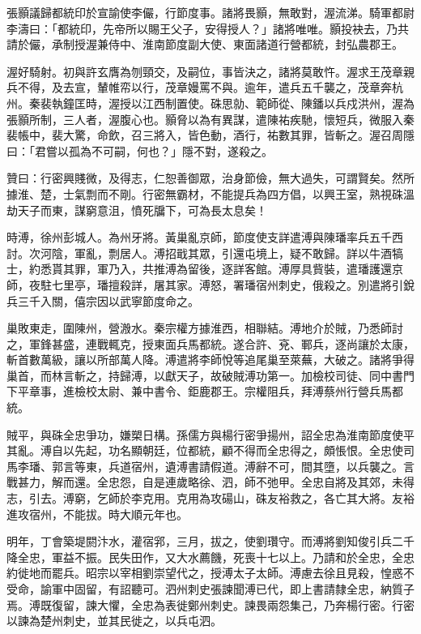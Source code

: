 \begin{pinyinscope}
 張顥議歸都統印於宣諭使李儼，行節度事。諸將畏顥，無敢對，渥流涕。騎軍都尉李濤曰：「都統印，先帝所以賜王父子，安得授人？」諸將唯唯。顥投袂去，乃共請於儼，承制授渥兼侍中、淮南節度副大使、東面諸道行營都統，封弘農郡王。



 渥好騎射。初與許玄膺為刎頸交，及嗣位，事皆決之，諸將莫敢忤。渥求王茂章親兵不得，及去宣，輦帷帟以行，茂章嫚罵不與。逾年，遣兵五千襲之，茂章奔杭州。秦裴執鐘匡時，渥授以江西制置使。硃思勍、範師從、陳鐇以兵戍洪州，渥為張顥所制，三人者，渥腹心也。顥脅以為有異謀，遣陳祐疾馳，懷短兵，微服入秦裴帳中，裴大驚，命飲，召三將入，皆色動，酒行，祐數其罪，皆斬之。渥召周隱曰：「君嘗以孤為不可嗣，何也？」隱不對，遂殺之。



 贊曰：行密興賤微，及得志，仁恕善御眾，治身節儉，無大過失，可謂賢矣。然所據淮、楚，士氣剽而不剛。行密無霸材，不能提兵為四方倡，以興王室，熟視硃溫劫天子而東，謀窮意沮，憤死牖下，可為長太息矣！



 時溥，徐州彭城人。為州牙將。黃巢亂京師，節度使支詳遣溥與陳璠率兵五千西討。次河陰，軍亂，剽居人。溥招戢其眾，引還屯境上，疑不敢歸。詳以牛酒犒士，約悉貰其罪，軍乃入，共推溥為留後，逐詳客館。溥厚具貲裝，遣璠護還京師，夜駐七里亭，璠擅殺詳，屠其家。溥怒，署璠宿州刺史，俄殺之。別遣將引銳兵三千入關，僖宗因以武寧節度命之。



 巢敗東走，圍陳州，營溵水。秦宗權方據淮西，相聯結。溥地介於賊，乃悉師討之，軍鋒甚盛，連戰輒克，授東面兵馬都統。遂合許、兗、鄆兵，逐尚讓於太康，斬首數萬級，讓以所部萬人降。溥遣將李師悅等追尾巢至萊蕪，大破之。諸將爭得巢首，而林言斬之，持歸溥，以獻天子，故破賊溥功第一。加檢校司徒、同中書門下平章事，進檢校太尉、兼中書令、鉅鹿郡王。宗權阻兵，拜溥蔡州行營兵馬都統。



 賊平，與硃全忠爭功，嫌槊日構。孫儒方與楊行密爭揚州，詔全忠為淮南節度使平其亂。溥自以先起，功名顯朝廷，位都統，顧不得而全忠得之，頗悵恨。全忠使司馬李璠、郭言等東，兵道宿州，遺溥書請假道。溥辭不可，間其墮，以兵襲之。言戰甚力，解而還。全忠怨，自是連歲略徐、泗，師不弛甲。全忠自將及其郊，未得志，引去。溥窮，乞師於李克用。克用為攻碭山，硃友裕救之，各亡其大將。友裕進攻宿州，不能拔。時大順元年也。



 明年，丁會築堤閼汴水，灌宿郛，三月，拔之，使劉瓚守。而溥將劉知俊引兵二千降全忠，軍益不振。民失田作，又大水薦饑，死喪十七以上。乃請和於全忠，全忠約徙地而罷兵。昭宗以宰相劉崇望代之，授溥太子太師。溥慮去徐且見殺，惶惑不受命，諭軍中固留，有詔聽可。泗州刺史張諫聞溥已代，即上書請隸全忠，納質子焉。溥既復留，諫大懼，全忠為表徙鄭州刺史。諫畏兩怨集己，乃奔楊行密。行密以諫為楚州刺史，並其民徙之，以兵屯泗。




\end{pinyinscope}
